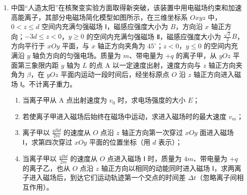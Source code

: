 \documentclass[\gkver]{gaokaozhenti}
\begin{document}
\begin{enumerate}
{可得 $a = \frac{370}{67} \Umsq$

由运动学公式可知

$v^{2} = 2aL$

解得

$L = \frac{67}{185} \Um$
}

\item
中国“人造太阳”在核聚变实验方面取得新突破，该装置中用电磁场约束和加速高能离子，其部分电磁场简化模型如图所示，在三维坐标系 $Oxyz$ 中，$0 < z \leq d$ 空间内充满匀强磁场 Ⅰ，磁感应强度大小为 $B$，方向沿 $x$ 轴正方向；$-3d \leq z < 0$，$y \geq 0$ 的空间内充满匀强磁场 Ⅱ，磁感应强度大小为 $\frac{\sqrt{2}}{2}B$，方向平行于 $xOy$ 平面，与 $x$ 轴正方向夹角为 $45^{\circ}$；$z < 0$，$y \leq 0$ 的空间内充满沿 $y$ 轴负方向的匀强电场。质量为 $m$、带电量为 $+q$ 的离子甲，从 $yOz$ 平面第三象限内距 $y$ 轴为 $L$ 的点 A 以一定速度出射，速度方向与 $z$ 轴正方向夹角为 $\beta$，在 $yOz$ 平面内运动一段时间后，经坐标原点 $O$ 沿 $z$ 轴正方向进入磁场 Ⅰ。不计离子重力。
\begin{enumerate}
	\item
	当离子甲从 A 点出射速度为 $v_{0}$ 时，求电场强度的大小 $E$；
	\item
	若使离子甲进入磁场后始终在磁场中运动，求进入磁场时的最大速度 $v_{m}$；
	\item
	离子甲以 $\frac{qBd}{2m}$ 的速度从 $O$ 点沿 $z$ 轴正方向第一次穿过 $xOy$ 面进入磁场 Ⅰ，求第四次穿过 $xOy$ 平面的位置坐标（用 $d$ 表示）；
	\item
	当离子甲以 $\frac{qBd}{2m}$ 的速度从 $O$ 点进入磁场 Ⅰ 时，质量为 $4m$、带电量为 $+q$ 的离子乙，也从 $O$ 点沿 $z$ 轴正方向以相同的动能同时进入磁场 Ⅰ，求两离子进入磁场后，到达它们运动轨迹第一个交点的时间差 $\Delta t$（忽略离子间相互作用）。
\end{enumerate}

\end{enumerate}
\end{document}
